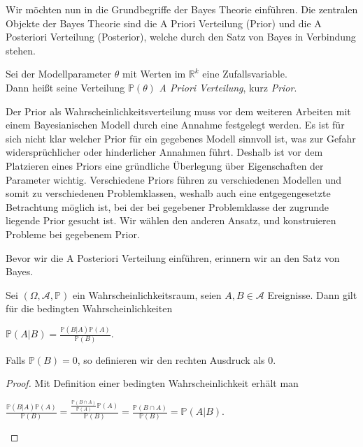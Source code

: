 Wir möchten nun in die Grundbegriffe der Bayes Theorie einführen. 
Die zentralen Objekte der Bayes Theorie sind die A Priori Verteilung (Prior) und die A Posteriori Verteilung (Posterior), welche durch den Satz von Bayes in Verbindung stehen. 

\begin{defi}
	Sei der Modellparameter $\theta$ mit Werten im $\mathbb{R}^k$ eine Zufallsvariable. 		\\
	Dann heißt seine Verteilung $\mathbb{P}(\theta)$ \textit{A Priori Verteilung}, kurz 		\textit{Prior}. 
\end{defi}

Der Prior als Wahrscheinlichkeitsverteilung muss vor dem weiteren Arbeiten mit einem Bayesianischen Modell durch eine Annahme festgelegt werden. Es ist für sich nicht klar welcher Prior für ein gegebenes Modell sinnvoll ist, was zur Gefahr widersprüchlicher oder hinderlicher Annahmen führt. Deshalb ist vor dem Platzieren eines Priors eine gründliche Überlegung über Eigenschaften der Parameter wichtig. Verschiedene Priors führen zu verschiedenen Modellen und somit zu verschiedenen Problemklassen, weshalb auch eine entgegengesetzte Betrachtung möglich ist, bei der bei gegebener Problemklasse der zugrunde liegende Prior gesucht ist. Wir wählen den anderen Ansatz, und konstruieren Probleme bei gegebenem Prior.

Bevor wir die A Posteriori Verteilung einführen, erinnern wir an den Satz von Bayes.

\begin{theorem}
	Sei $(\Omega, \mathcal{A}, \mathbb{P})$ ein Wahrscheinlichkeitsraum, seien 
	$A,B \in \mathcal{A}$ Ereignisse. Dann gilt für die bedingten Wahrscheinlichkeiten
	\begin{center}
		$\mathbb{P}(A\vert B) = \frac{\mathbb{P}(B \vert A) \mathbb{P}(A)}{\mathbb{P}				(B)}$.
	\end{center}
	Falls $\mathbb{P}(B) = 0$, so definieren wir den rechten Ausdruck als $0$.
\end{theorem}

\begin{proof}
	Mit Definition einer bedingten Wahrscheinlichkeit erhält man
	\begin{center}
		$\frac{\mathbb{P}(B \vert A) \mathbb{P}(A)}{\mathbb{P}(B)}
		= \frac{\frac{\mathbb{P}(B \cap A)}{\mathbb{P}(A)} \mathbb{P}(A)}{\mathbb{P}(B)}
		= \frac{\mathbb{P}(B \cap A)}{\mathbb{P}(B)}
		= \mathbb{P}(A\vert B)$.
	\end{center}
\end{proof}

